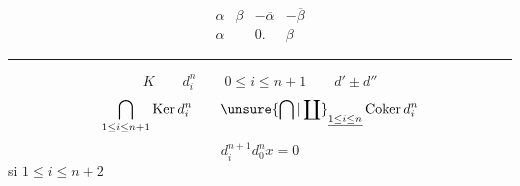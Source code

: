\[\begin{array}{cccc}\alpha&\beta&-\overline\alpha&-\overline\beta\\\alpha&&0.&\beta\end{array}\]
\noindent\rule{\linewidth}{.3pt}

\[K\qquad d_i^n\qquad0\leq i\leq n+1\qquad d'\pm d''\]
\[
\bigcap_{1\leq i\leq n+1}\operatorname{Ker}d_i^n\qquad
\unsure{\bigcap|\coprod}_{\underline{1\leq i\leq n}}\operatorname{Coker}d_i^n
\]
\[d_i^{n+1}d_0^n x=0\]
si $1\leq i\leq n+2$

